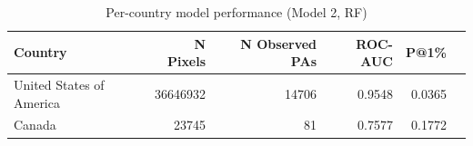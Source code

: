 \begin{table}[h]
\centering
\begin{tabular}{lrrrrr}
\toprule
Country & N Pixels & N Observed PAs & ROC-AUC & P@1\% \\
\midrule
United States of America & 36646932 & 14706 & 0.9548 & 0.0365 \\
Canada & 23745 & 81 & 0.7577 & 0.1772 \\
\bottomrule
\end{tabular}
\caption{Per-country model performance (Model 2, RF)}
\label{tab:country_breakdown_rf}
\end{table}
